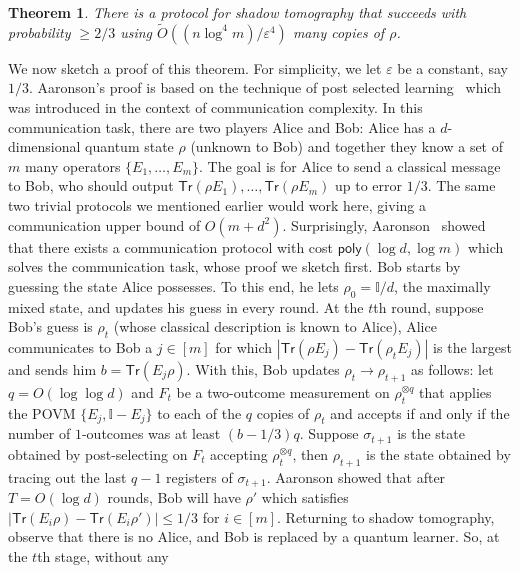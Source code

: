 \documentclass[11pt]{article}
\newcommand{\id}{\ensuremath{\mathbb{I}}}
\newcommand{\Tr}{\textsf{Tr}}
\newtheorem{theorem}{Theorem}
\begin{document}
\begin{theorem}
There is a protocol for shadow tomography that succeeds with probability $\geq 2/3$ using $\widetilde{O}((n\log^4 m)/\varepsilon^4)$ many copies of $\rho$.
\end{theorem}
We now sketch a proof of this theorem.  For simplicity, we let $\varepsilon$ be a constant, say $1/3$. Aaronson's proof is based on the technique of post selected learning~\cite{aaronson2007learnability} which was introduced in the context of communication complexity. In this communication task, there are two players Alice and Bob: Alice has a $d$-dimensional quantum state $\rho$ (unknown to Bob) and together they know a set of $m$ many operators $\{E_1,\ldots,E_m\}$. The goal is for Alice to send a classical message to Bob, who should output $\Tr(\rho E_1),\ldots,\Tr(\rho E_m)$ up to  error $1/3$.  The same two trivial protocols we mentioned earlier would work here, giving a communication upper bound of $O(m+d^2)$. 
Surprisingly, Aaronson~\cite{aaronson2007learnability} showed that there exists a communication protocol with cost  $\textsf{poly}(\log d,\log m)$ which solves the communication task, whose proof we sketch first.  Bob starts by guessing the state Alice possesses. To this end, he lets $\rho_0=\id/d$, the maximally mixed state, and updates his guess in every round. At the $t$th round, suppose Bob’s guess is $\rho_t$ (whose classical description is known to Alice), Alice communicates to Bob a $j\in [m]$ for which $|\Tr(\rho E_j)-\Tr(\rho_t E_j)|$ is the largest and sends him $b = \Tr(E_j\rho)$. With this, Bob updates $\rho_t\rightarrow\rho_{t+1}$ as follows: let $q = O(\log \log d)$ and
$F_t$ be a two-outcome measurement on $\rho_t^{\otimes q}$ that applies the POVM $\{E_j, \id-E_j\}$ to each of the $q$ copies of $\rho_t$
and accepts if and only if the number of $1$-outcomes was at least $(b - 1/3)q$.  Suppose $\sigma_{t+1}$ is the state obtained by post-selecting on $F_t$ accepting $\rho^{\otimes q}_t$, then $\rho_{t+1}$
is the state obtained by tracing out the last $q-1$ registers of $\sigma_{t+1}$.  Aaronson
showed that after $T = O(\log d)$ rounds, Bob will have $\rho'$ which satisfies $|\Tr(E_i\rho) - \Tr(E_i\rho')| \leq 1/3$ for $i \in [m]$. Returning to shadow tomography,  observe that there is no Alice, and Bob is replaced by a quantum learner. So, at the $t$th stage, without any
\end{document}
